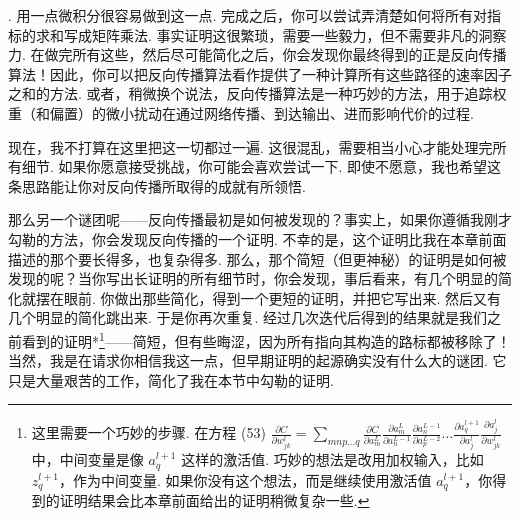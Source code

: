 \noindent. 用一点微积分很容易做到这一点. 完成之后，你可以尝试弄清楚如何将所有对指标的求和写成矩阵乘法. 事实证明这很繁琐，需要一些毅力，但不需要非凡的洞察力. 在做完所有这些，然后尽可能简化之后，你会发现你最终得到的正是反向传播算法！因此，你可以把反向传播算法看作提供了一种计算所有这些路径的速率因子之和的方法. 或者，稍微换个说法，反向传播算法是一种巧妙的方法，用于追踪权重（和偏置）的微小扰动在通过网络传播、到达输出、进而影响代价的过程.

现在，我不打算在这里把这一切都过一遍. 这很混乱，需要相当小心才能处理完所有细节. 如果你愿意接受挑战，你可能会喜欢尝试一下. 即使不愿意，我也希望这条思路能让你对反向传播所取得的成就有所领悟.

那么另一个谜团呢——反向传播最初是如何被发现的？事实上，如果你遵循我刚才勾勒的方法，你会发现反向传播的一个证明. 不幸的是，这个证明比我在本章前面描述的那个要长得多，也复杂得多. 那么，那个简短（但更神秘）的证明是如何被发现的呢？当你写出长证明的所有细节时，你会发现，事后看来，有几个明显的简化就摆在眼前. 你做出那些简化，得到一个更短的证明，并把它写出来. 然后又有几个明显的简化跳出来. 于是你再次重复. 经过几次迭代后得到的结果就是我们之前看到的证明*\footnote{这里需要一个巧妙的步骤. 在方程 (53) $\frac{\partial C}{\partial w^l_{jk}} = \sum_{mnp\ldots q} \frac{\partial C}{\partial a^L_m} \frac{\partial a^L_m}{\partial a^{L-1}_n} \frac{\partial a^{L-1}_n}{\partial a^{L-2}_p} \ldots \frac{\partial a^{l+1}_q}{\partial a^l_j} \frac{\partial a^l_j}{\partial w^l_{jk}}$ 中，中间变量是像 $a_q^{l+1}$ 这样的激活值. 巧妙的想法是改用加权输入，比如 $z^{l+1}_q$，作为中间变量. 如果你没有这个想法，而是继续使用激活值 $a^{l+1}_q$，你得到的证明结果会比本章前面给出的证明稍微复杂一些.}——简短，但有些晦涩，因为所有指向其构造的路标都被移除了！当然，我是在请求你相信我这一点，但早期证明的起源确实没有什么大的谜团. 它只是大量艰苦的工作，简化了我在本节中勾勒的证明.
